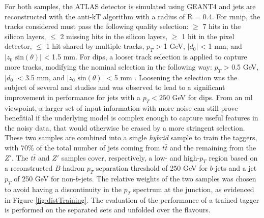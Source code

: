 For both samples, the ATLAS detector is simulated using GEANT4 \cite{Agostinelli:602040} and jets are reconstructed with the anti-kT algorithm with a radius of R = 0.4.  For \gls{rnnip}, the tracks considered must pass the following quality selection: $\geq$ 7 hits in the silicon layers, $\leq$ 2 missing hits in the silicon layers, $\geq$ 1 hit in the pixel detector, $\leq$ 1 hit shared by multiple tracks, $p_T$ > 1 GeV, $|d_0|$ < 1 mm, and $|z_0 \textrm{ sin}(\theta)|$ < 1.5 mm. For \gls{dips}, a looser track selection is applied to capture more tracks, modifying the nominal selection in the following way: $p_T$ > 0.5 GeV, $|d_0|$ < 3.5 mm, and $|z_0 \textrm{ sin}(\theta)|$ < 5 mm \cite{ATL-PHYS-PUB-2020-014}. Loosening the selection was the subject of several and studies and was observed to lead to a significant improvement in performance for jets with a $p_T < 250$ GeV for \gls{dips}. From an \gls{ml} viewpoint, a larger set of input information with more noise can still prove benefitial if the underlying model is complex enough to capture useful features in the noisy data, that would otherwise be erased by a more stringent selection. \\

These two samples are combined into a single \textit{hybrid} sample to train the taggers, with 70\% of the total number of jets coming from $t\bar{t}$ and the remaining from the $Z'$. The $t\bar{t}$ and $Z'$ samples cover, respectively, a low- and high-$p_T$ region based on a reconstructed $B$-hadron $p_T$ separation threshold of 250 GeV for $b$-jets and a jet $p_T$ of 250 GeV for non-$b$-jets. The relative weights of the two samples was chosen to avoid having a discontinuity in the $p_T$ spectrum at the junction, as evidenced in Figure \ref{fig:distTraining}. The evaluation of the performance of a trained tagger is performed on the separated sets and unfolded over the flavours.\\

